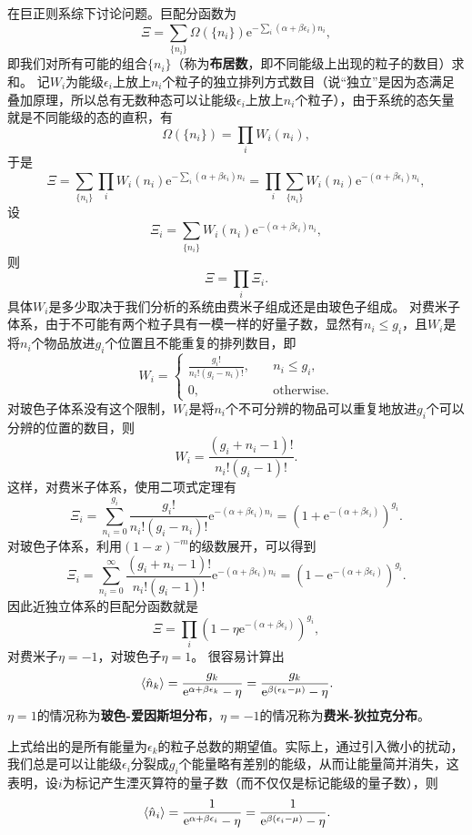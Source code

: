 \documentclass[hyperref, UTF8, a4paper]{ctexart}
\newcommand*{\ee}{\mathrm{e}}
\begin{document}
在巨正则系综下讨论问题。巨配分函数为
\[
    \Xi = \sum_{\{n_i\}} \Omega(\{n_i\}) \ee^{- \sum_i (\alpha + \beta \epsilon_i) n_i},
\]
即我们对所有可能的组合$\{n_i\}$（称为\textbf{布居数}，即不同能级上出现的粒子的数目）求和。
记$W_i$为能级$\epsilon_i$上放上$n_i$个粒子的独立排列方式数目（说“独立”是因为态满足叠加原理，所以总有无数种态可以让能级$\epsilon_i$上放上$n_i$个粒子），由于系统的态矢量就是不同能级的态的直积，有
\[
    \Omega(\{n_i\}) = \prod_i W_i(n_i),
\]
于是
\[
    \Xi = \sum_{\{n_i\}} \prod_i W_i(n_i) \ee^{- \sum_i (\alpha + \beta \epsilon_i) n_i} = \prod_i \sum_{\{n_i\}} W_i(n_i) \ee^{-  (\alpha + \beta \epsilon_i) n_i},
\]
设
\[
    \Xi_i = \sum_{\{n_i\}} W_i(n_i) \ee^{-  (\alpha + \beta \epsilon_i) n_i},
\]
则
\[
    \Xi = \prod_i \Xi_i.
\]
具体$W_i$是多少取决于我们分析的系统由费米子组成还是由玻色子组成。
对费米子体系，由于不可能有两个粒子具有一模一样的好量子数，显然有$n_i \leq g_i$，且$W_i$是将$n_i$个物品放进$g_i$个位置且不能重复的排列数目，即
\[
    W_i = \begin{cases}
        \frac{g_i !}{n_i ! (g_i - n_i) !}, &\quad n_i \leq g_i, \\
        0, &\quad \text{otherwise}.
    \end{cases}
\]
对玻色子体系没有这个限制，$W_i$是将$n_i$个不可分辨的物品可以重复地放进$g_i$个可以分辨的位置的数目，则
\[
    W_i = \frac{(g_i + n_i - 1) !}{n_i ! (g_i - 1)!}.
\]
这样，对费米子体系，使用二项式定理有
\[
    \Xi_i = \sum_{n_i=0}^{g_i} \frac{g_i !}{n_i ! (g_i - n_i) !} \ee^{- (\alpha + \beta \epsilon_i) n_i} = \left( 1 + \ee^{- (\alpha + \beta \epsilon_i) } \right)^{g_i}.
\]
对玻色子体系，利用$(1-x)^{-m}$的级数展开，可以得到
\[
    \Xi_i = \sum_{n_i=0}^\infty \frac{(g_i + n_i - 1) !}{n_i ! (g_i - 1)!} \ee^{- (\alpha + \beta \epsilon_i) n_i} = (1 - \ee^{- (\alpha + \beta \epsilon_i)})^{g_i}.
\]
因此近独立体系的巨配分函数就是
\begin{equation}
    \Xi = \prod_i (1 - \eta \ee^{- (\alpha + \beta \epsilon_i)})^{g_i},
\end{equation}
对费米子$\eta=-1$，对玻色子$\eta=1$。
很容易计算出
\begin{equation}
    \expval*{\hat{n}_k} = \frac{g_k}{\ee^{\alpha + \beta \epsilon_k} - \eta} = \frac{g_k}{\ee^{\beta (\epsilon_k - \mu)} - \eta}.
\end{equation}
$\eta=1$的情况称为\textbf{玻色-爱因斯坦分布}，$\eta=-1$的情况称为\textbf{费米-狄拉克分布}。

上式给出的是所有能量为$\epsilon_k$的粒子总数的期望值。实际上，通过引入微小的扰动，我们总是可以让能级$\epsilon_i$分裂成$g_i$个能量略有差别的能级，从而让能量简并消失，这表明，设$i$为标记产生湮灭算符的量子数（而不仅仅是标记能级的量子数），则
\begin{equation}
    \expval*{\hat{n}_i} = \frac{1}{\ee^{ \alpha + \beta \epsilon_i} - \eta } = \frac{1}{\ee^{\beta (\epsilon_i - \mu)} - \eta }.
\end{equation}
\end{document}
